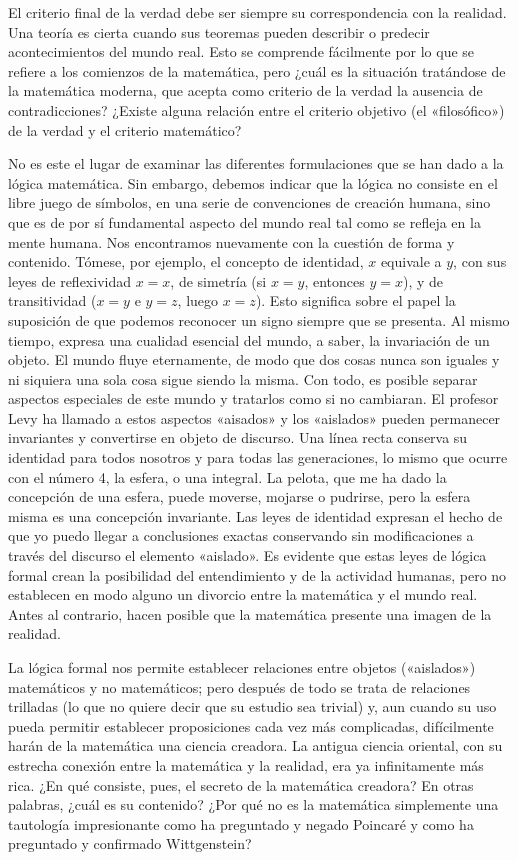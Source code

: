 \documentclass[a4paper, 12pt]{article}
\begin{document}
{{El criterio final de la verdad debe ser siempre su correspondencia con la
realidad. Una teoría es cierta cuando sus teoremas pueden describir o predecir
acontecimientos del mundo real. Esto se comprende fácilmente por lo que se
refiere a los comienzos de la matemática, pero ¿cuál es la situación tratándose
de la matemática moderna, que acepta como criterio de la verdad la ausencia de
contradicciones? ¿Existe alguna relación entre el criterio objetivo (el
«filosófico») de la verdad y el criterio matemático?

No es este el lugar de examinar las diferentes formulaciones que se han dado a
la lógica matemática. Sin embargo, debemos indicar que la lógica no consiste en
el libre juego de símbolos, en una serie de convenciones de creación humana,
sino que es de por sí fundamental aspecto del mundo real tal como se refleja en
la mente humana. Nos encontramos nuevamente con la cuestión de forma y
contenido. Tómese, por ejemplo, el concepto de identidad, $x$ equivale a $y$,
con sus leyes de reflexividad $x = x$, de simetría (si $x = y$, entonces $y =
x$), y de transitividad ($x = y$ e  $y = z$, luego $x = z$). Esto significa
sobre el papel la suposición de que podemos reconocer un signo siempre que se
presenta. Al mismo tiempo, expresa una cualidad esencial del mundo, a saber, la
invariación de un objeto. El mundo fluye eternamente, de modo que dos cosas
nunca son iguales y ni siquiera una sola cosa sigue siendo la misma. Con todo,
es posible separar aspectos especiales de este mundo y tratarlos como si no
cambiaran. El profesor Levy ha llamado a estos aspectos «aisados»  y los
«aislados» pueden permanecer invariantes y convertirse en objeto de discurso.
Una línea recta conserva su identidad para todos nosotros y para todas las
generaciones, lo mismo que ocurre con el número 4, la esfera, o una integral. La
pelota, que me ha dado la concepción de una esfera, puede moverse, mojarse o
pudrirse, pero la esfera misma es una concepción invariante. Las leyes de
identidad expresan el hecho de que yo puedo llegar a conclusiones exactas
conservando sin modificaciones a través del discurso el elemento «aislado». Es
evidente que estas leyes de lógica formal crean la posibilidad del entendimiento
y de la actividad humanas, pero no establecen en modo alguno un divorcio entre
la matemática y el mundo real. Antes al contrario, hacen posible que la
matemática presente una imagen de la realidad.

La lógica formal nos permite establecer relaciones entre objetos («ais\-lados»)
matemáticos y no matemáticos; pero después de todo se trata de relaciones
trilladas (lo que no quiere decir que su estudio sea trivial) y, aun cuando su
uso pueda permitir establecer proposiciones cada vez más complicadas,
difícilmente harán de la matemática una ciencia creadora. La antigua ciencia
oriental, con su estrecha conexión entre la matemática y la realidad, era ya
infinitamente más rica. ¿En qué consiste, pues, el secreto de la matemática
creadora? En otras palabras, ¿cuál es su contenido? ¿Por qué no es la matemática
simplemente una tautología impresionante como ha preguntado y negado Poincaré y
como ha preguntado y confirmado Wittgenstein?

}}
\end{document}
